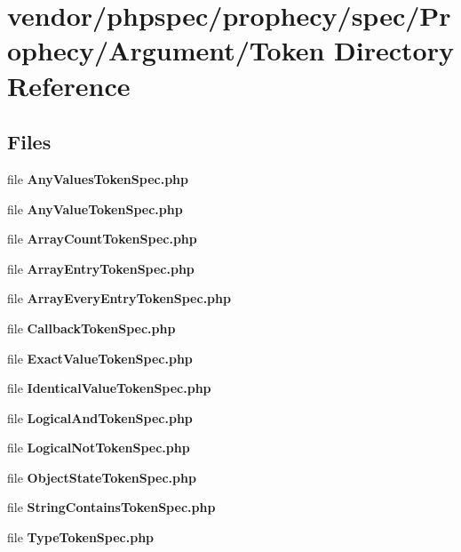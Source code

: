 \section{vendor/phpspec/prophecy/spec/\+Prophecy/\+Argument/\+Token Directory Reference}
\label{dir_edb5c40790b5a2555a5fcfb4c9bffff1}
\subsection*{Files}
\begin{DoxyCompactItemize}
\item 
file {\bf Any\+Values\+Token\+Spec.\+php}
\item 
file {\bf Any\+Value\+Token\+Spec.\+php}
\item 
file {\bf Array\+Count\+Token\+Spec.\+php}
\item 
file {\bf Array\+Entry\+Token\+Spec.\+php}
\item 
file {\bf Array\+Every\+Entry\+Token\+Spec.\+php}
\item 
file {\bf Callback\+Token\+Spec.\+php}
\item 
file {\bf Exact\+Value\+Token\+Spec.\+php}
\item 
file {\bf Identical\+Value\+Token\+Spec.\+php}
\item 
file {\bf Logical\+And\+Token\+Spec.\+php}
\item 
file {\bf Logical\+Not\+Token\+Spec.\+php}
\item 
file {\bf Object\+State\+Token\+Spec.\+php}
\item 
file {\bf String\+Contains\+Token\+Spec.\+php}
\item 
file {\bf Type\+Token\+Spec.\+php}
\end{DoxyCompactItemize}
